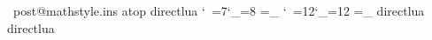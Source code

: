 \endbatchfile
\ post@mathstyle.ins 
atop
\@saveprimitive\above\@@above
\@saveprimitive\overwithdelims\@@overwithdelims
\@saveprimitive\atopwithdelims\@@atopwithdelims
\@saveprimitive\abovewithdelims\@@abovewithdelims
\begingroup\expandafter\expandafter\expandafter\endgroup
\expandafter\ifx\csname directlua\endcsname\relax
  \DeclareRobustCommand{\displaystyle}{%
    \@@displaystyle \chardef\mathstyle\z@}
  \DeclareRobustCommand{\textstyle}{%
    \@@textstyle \chardef\mathstyle\tw@}
  \DeclareRobustCommand{\scriptstyle}{%
    \@@scriptstyle \chardef\mathstyle4 }
  \DeclareRobustCommand{\scriptscriptstyle}{%
    \@@scriptscriptstyle \chardef\mathstyle6 }
\fi
\begingroup \catcode`\
=7\relax \catcode`\_=8\relax %
\lowercase{\endgroup
\let\@@superscript=
 \let\@@subscript=_
}%
\begingroup \catcode`\
=12\relax \catcode`\_=12\relax %
\lowercase{\endgroup
\let\@@superscript@other=
 \let\@@subscript@other=_
}%
\begingroup\expandafter\expandafter\expandafter\endgroup
\expandafter\ifx\csname directlua\endcsname\relax
  \def\subsupstyle{%
    \ifnum\mathstyle<5 \chardef\mathstyle4 %
    \else \chardef\mathstyle6 %
    \fi
  }
\else
  \def\subsupstyle{}
\fi
\let\mathsup=\@@superscript
\let\mathsub=\@@subscript
\def\sb#1{\mathsub{\protect\subsupstyle#1}}%
\def\sp#1{\mathsup{\protect\subsupstyle#1}}%
\def\mathchoice{%
  \relax\ifcase\mathstyle
    \expandafter\@firstoffour %
  \or
    \expandafter\@firstoffour %
  \or
    \expandafter\@secondoffour %
  \or
    \expandafter\@secondoffour %
  \or
    \expandafter\@thirdoffour %
  \or
    \expandafter\@thirdoffour %
  \else
    \expandafter\@fourthoffour %
  \fi
}
\providecommand\@firstoffour[4]{#1}
\providecommand\@secondoffour[4]{#2}
\providecommand\@thirdoffour[4]{#3}
\providecommand\@fourthoffour[4]{#4}
\DeclareRobustCommand\genfrac[6]{%
  {#1\fracstyle
    {\begingroup #5\endgroup
      \csname @@\ifx\maxdimen#4\maxdimen over\else above\fi
        \if @#2@\else withdelims\fi\endcsname #2#3#4\relax
     #6}%
  }%
}
\renewcommand{\frac}{\genfrac{}{}{}{}}
\providecommand{\dfrac}{}
\providecommand{\tfrac}{}
\renewcommand{\dfrac}{\genfrac\displaystyle{}{}{}}
\renewcommand{\tfrac}{\genfrac\textstyle{}{}{}}
\providecommand{\binom}{}
\providecommand{\tbinom}{}
\providecommand{\dbinom}{}
\renewcommand{\binom}{\genfrac{}(){0pt}}
\renewcommand{\dbinom}{\genfrac\displaystyle(){0pt}}
\renewcommand{\tbinom}{\genfrac\textstyle(){0pt}}
\begingroup\expandafter\expandafter\expandafter\endgroup
\expandafter\ifx\csname directlua\endcsname\relax
